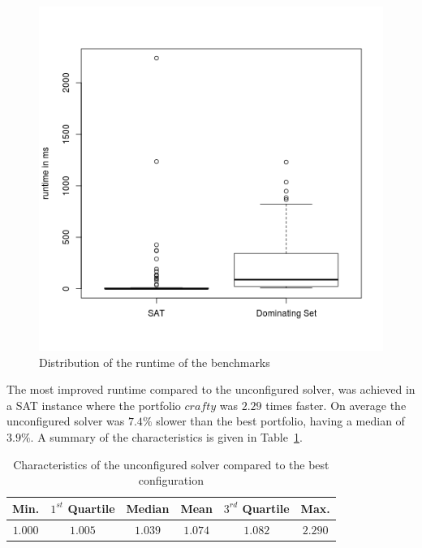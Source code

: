 \begin{figure}[h]
	\center
	\includegraphics[scale=\figscale]{figures/runtime.png}
	\caption{Distribution of the runtime of the benchmarks\label{fig:runtime}}
\end{figure}

The most improved runtime compared to the unconfigured solver, was achieved in a SAT instance where the portfolio \inline$crafty$ was $2.29$ times faster. On average the unconfigured solver was $7.4\%$ slower than the best portfolio, having a median of $3.9\%$. A summary of the characteristics is given in Table~\ref{tbl:charcmp}.

\begin{table}[h]
	\center
	\begin{tabular}{c|c|c|c|c|c}
		Min. & $1^{st}$ Quartile & Median & Mean & $3^{rd}$ Quartile & Max. \\
		\hline
		$1.000$&$1.005$&$1.039$&$1.074$&$1.082$ &$2.290$
	\end{tabular}
	\caption{Characteristics of the unconfigured solver compared to the best configuration\label{tbl:charcmp}}
\end{table}

